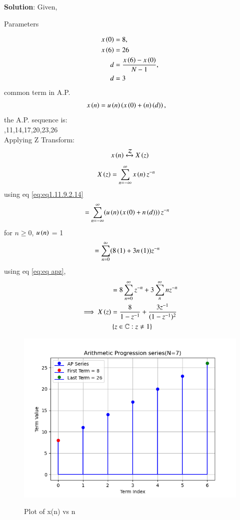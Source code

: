 \documentclass[journal,12pt,twocolumn]{IEEEtran}
\begin{document}
\noindent \textbf{Solution}:
\noindent
Given,
\begin{table}[h]
    \centering
    
    \caption{Parameters}
    \label{tab: 11.9.2.14.1}
\end{table}
\begin{align}
    x\brak{0}&=8,\\  %
    x\brak{6}&=26  \\  %
	d&=\frac{x\brak{6} - x\brak{0}}{N-1},\\
    d&=3
\end{align}
common term in A.P.
\begin{align}
	x\left(n\right)&=u\left(n\right)\left(x\left(0\right)+\left(n\right)\left(d\right)\right),
    \label{eq:eq1.11.9.2.14}
\end{align}
the A.P. sequence is:\\
 ,11,14,17,20,23,26\\
Applying Z Transform:     
\begin{align}
	x \left(n\right) \xleftrightarrow{\mathcal{Z}} X \left(z\right) 
\end{align}
\begin{align}
    X \left(z\right) & = \sum_{n=-\infty}^{\infty} x \left(n\right)   z^{-n} 
\end{align}
using eq \eqref{eq:eq1.11.9.2.14}
\begin{align}
	&=\sum_{n=-\infty}^{\infty}(u\left(n\right)\left(x\left(0\right)+n\left(d\right))\right)z^{-n}
 \end{align}
 for $n\geq $0, $u\left(n\right)$ = 1
 \begin{align}
	&=\sum_{n=0}^{\infty} (8\left(1\right) + 3n\left(1\right)) z^{-n}
 \end{align}
using eq \eqref{eq:eq apz},
\begin{align}
    &=8 \sum_{n=0}^{\infty}  z^{-n} + 3 \sum_n^{\infty} n z^{-n}\\
    \implies X\left(z\right)&=\frac{8}{1-z^{-1}} + \frac{3 z^{-1}}{(1-z^{-1})^2}\\
    \notag &\left\{z\in\mathbb{C} : z \neq 1\right\}
\end{align}
\begin{figure}[ht]
\centering
   \includegraphics[width=1\linewidth]{figs/plot1.png}
   \caption{Plot of x(n) vs n}
   \hfill\label{fig: 11.9.2.14}
\end{figure}
\end{document}
